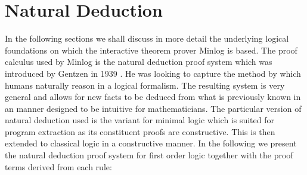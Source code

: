 \section{Natural Deduction}
In the following sections we shall discuss in more detail the underlying logical foundations on which the interactive theorem prover Minlog is based. The proof calculus used by Minlog is the natural deduction proof system which was introduced by Gentzen in 1939 \cite{GG69}. He was looking to capture the method by which humans naturally reason in a logical formalism.  The resulting system is very general and allows for new facts to be deduced from what is previously known in an manner designed to be intuitive for mathematicians.  The particular version of natural deduction used is the variant for minimal logic which is suited for program extraction as its constituent proofs are constructive. This is then extended to classical logic in a constructive manner. In the following we present the natural deduction proof system  for first order logic together with the proof terms derived from each rule:  \medskip
%
